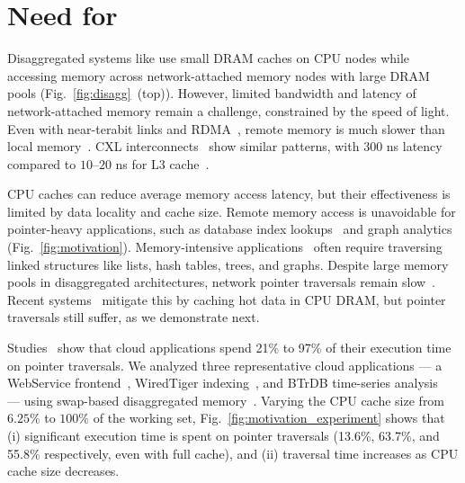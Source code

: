 

\section{Need for \pulse}
\label{sec:needforpulse}


Disaggregated systems like \mind use small DRAM caches on CPU nodes while accessing memory across network-attached memory nodes with large DRAM pools (Fig.~\ref{fig:disagg}~(top)). However, limited bandwidth and latency of network-attached memory remain a challenge, constrained by the speed of light. Even with near-terabit links and RDMA~\cite{rdmalatency}, remote memory is much slower than local memory~\cite{disagg}. CXL interconnects~\cite{cxl} show similar patterns, with $300$ ns latency compared to $10$--$20$ ns for L3 cache~\cite{pond}. 

CPU caches can reduce average memory access latency, but their effectiveness is limited by data locality and cache size. Remote memory access is unavoidable for pointer-heavy applications, such as database index lookups~\cite{hash1, hash2, hash3, succinct, trie2, btree1, btree2, trie1, blowfish, trie3, surf} and graph analytics~\cite{powergraph, graphx, graphchi, pagerank} (Fig.~\ref{fig:motivation}). Memory-intensive applications~\cite{scuba, cachelib, tao, memcache, flighttracker, twittercache, spark} often require traversing linked structures like lists, hash tables, trees, and graphs. Despite large memory pools in disaggregated architectures, network pointer traversals remain slow~\cite{disagg}. Recent systems~\cite{disagg, legoos, mind, infiniswap, fastswap} mitigate this by caching hot data in CPU DRAM, but pointer traversals still suffer, as we demonstrate next.

 Studies~\cite{graphchi, monetdb, spark, voltdb, memc3, db1000, memcached} show that cloud applications spend 21\% to 97\% of their execution time on pointer traversals. We analyzed three representative cloud applications — a WebService frontend~\cite{aifm}, WiredTiger indexing~\cite{wiredtiger}, and BTrDB time-series analysis~\cite{btrdb} — using swap-based disaggregated memory~\cite{infiniswap}. Varying the CPU cache size from $6.25\%$ to $100\%$ of the working set, Fig.~\ref{fig:motivation_experiment} shows that (i) significant execution time is spent on pointer traversals (13.6\%, 63.7\%, and 55.8\% respectively, even with full cache), and (ii) traversal time increases as CPU cache size decreases.

